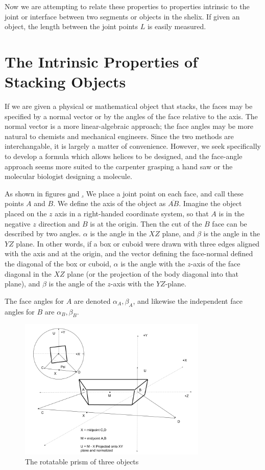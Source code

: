 \documentclass[11pt]{article}
\begin{document}
{Now we are attempting to relate these properties to properties intrinsic to the joint or interface between
two segments or objects in the shelix. If given an object, the length between the joint points $L$ is
easily measured.

\section{The Intrinsic Properties of Stacking Objects}

If we are given a physical or mathematical object that stacks,
the faces may be specified by a normal vector or by the
angles of the face relative to the axis. The normal vector
is a more linear-algebraic approach; the face angles may be more
natural to chemists and mechanical engineers. Since
the two methods are interchangable, it is largely a matter of
convenience. However, we seek specifically to develop a formula
which allows helices to be designed, and the face-angle approach
seems more suited to the carpenter grasping a hand saw or the
molecular biologist designing a molecule.

As shown in figures \href{fig:intrinsicdiagram} and \href{fig:jointdiagram},
We place a joint point on each face, and call these points $A$ and $B$.
We define the axis of the object as $\overline{AB}$. Imagine the
object placed on the $z$ axis in a right-handed coordinate system, so that
$A$ is in the negative $z$ direction and $B$ is at the origin. Then
the cut of the $B$ face can be described by two angles. $\alpha$ is the
angle in the $XZ$ plane, and $\beta$ is the angle in the $YZ$ plane.
In other words, if a box or cuboid were drawn with three edges aligned
with the axis and at the origin, and the vector defining the face-normal
defined the diagonal of the box or cuboid, $\alpha$ is the angle with the $z$-axis
of the
face diagonal in the $XZ$ plane (or the projection of the body diagonal
into that plane), and $\beta$ is the angle of the $z$-axis with the $YZ$-plane.

The face angles for $A$ are denoted $\alpha_A, \beta_A$, and likewise
the independent face angles for $B$ are $\alpha_B, \beta_B$.


\begin{figure}
     \centering
     \includegraphics[width=0.80\textwidth]{figures/ObjectForStackingSetup.png}
     \caption{The rotatable prism of three objects}
  \label{fig:intrinsicdiagram}
\end{figure}

}
\end{document}

